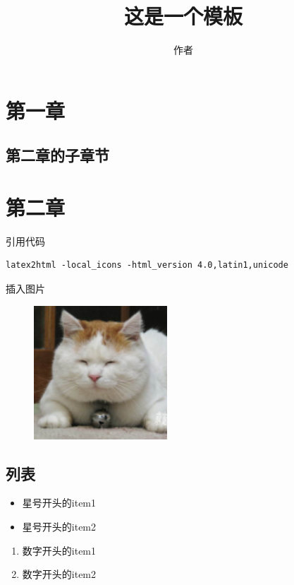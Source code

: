 
\author{作者}
\title{这是一个模板}

\maketitle
\tableofcontents
\newpage
\section{第一章}
\subsection{第二章的子章节}
\section{第二章}
引用代码
\begin{verbatim}
latex2html -local_icons -html_version 4.0,latin1,unicode
\end{verbatim}
插入图片
\begin{figure}[htbp]
  \includegraphics[width=5cm]{cat.png}
\end{figure}
\subsection{列表}
\begin{itemize}
\item 星号开头的item1
\item 星号开头的item2
\end{itemize}

\begin{enumerate}
\item 数字开头的item1
\item 数字开头的item2
\end{enumerate}


